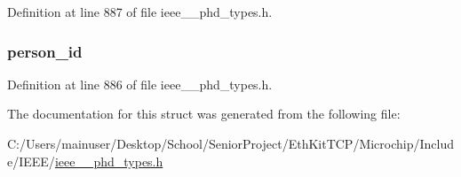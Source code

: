 Definition at line 887 of file ieee\+\_\+\_\+phd\+\_\+types.\+h.

\hypertarget{struct___scan_report_per_var_a508e6969c9e1531b94e99ea24031d53b}{}
\subsubsection[{person\+\_\+id}]{ person\+\_\+id}\label{struct___scan_report_per_var_a508e6969c9e1531b94e99ea24031d53b}


Definition at line 886 of file ieee\+\_\+\_\+phd\+\_\+types.\+h.



The documentation for this struct was generated from the following file\+:\begin{DoxyCompactItemize}
\item 
C\+:/\+Users/mainuser/\+Desktop/\+School/\+Senior\+Project/\+Eth\+Kit\+T\+C\+P/\+Microchip/\+Include/\+I\+E\+E\+E/\hyperlink{ieee__11073__phd__types_8h}{ieee\+\_\+\_\+phd\+\_\+types.\+h}\end{DoxyCompactItemize}
